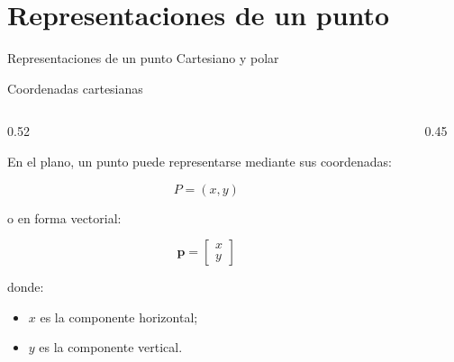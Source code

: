 \documentclass[aspectratio=169]{beamer}
\begin{document}
\section{Representaciones de un punto}

\SectionSlide
{Representaciones de un punto}
{Cartesiano y polar}

\begin{frame}{Coordenadas cartesianas}

    \begin{columns}[T]

        \begin{column}{0.52\textwidth}

            En el plano, un punto puede representarse mediante sus coordenadas:

            \[
            P=(x,y)
            \]

            o en forma vectorial:

            \[
            \mathbf{p}
            =
            \begin{bmatrix}
                x\\
                y
            \end{bmatrix}
            \]

            donde:

            \begin{itemize}
                \item $x$ es la componente horizontal;
                \item $y$ es la componente vertical.
            \end{itemize}

        \end{column}

        \begin{column}{0.45\textwidth}

            \begin{center}
\end{center}
\end{column}
\end{columns}
\end{frame}
\end{document}
